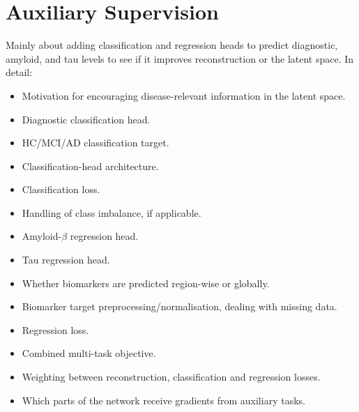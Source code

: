 \section{Auxiliary Supervision}
Mainly about adding classification and regression heads to predict diagnostic, amyloid, and tau levels to see if it improves reconstruction or the latent space. In detail:
\begin{itemize}
    \item Motivation for encouraging disease-relevant information in the latent space.
    \item Diagnostic classification head.
    \item HC/MCI/AD classification target.
    \item Classification-head architecture.
    \item Classification loss.
    \item Handling of class imbalance, if applicable.
    \item Amyloid-$\beta$ regression head.
    \item Tau regression head.
    \item Whether biomarkers are predicted region-wise or globally.
    \item Biomarker target preprocessing/normalisation, dealing with missing data.
    \item Regression loss.
    \item Combined multi-task objective.
    \item Weighting between reconstruction, classification and regression losses.
    \item Which parts of the network receive gradients from auxiliary tasks.
\end{itemize}

